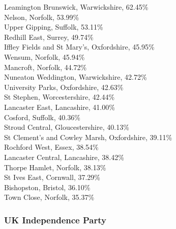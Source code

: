 \documentclass[a4paper,openany,10pt]{book}
\begin{document}
Leamington Brunswick, Warwickshire, 62.45\%\\
Nelson, Norfolk, 53.99\%\\
Upper Gipping, Suffolk, 53.11\%\\
Redhill East, Surrey, 49.74\%\\
Iffley Fields and St Mary's, Oxfordshire, 45.95\%\\
Wensum, Norfolk, 45.94\%\\
Mancroft, Norfolk, 44.72\%\\
Nuneaton Weddington, Warwickshire, 42.72\%\\
University Parks, Oxfordshire, 42.63\%\\
St Stephen, Worcestershire, 42.44\%\\
Lancaster East, Lancashire, 41.00\%\\
Cosford, Suffolk, 40.36\%\\
Stroud Central, Gloucestershire, 40.13\%\\
St Clement's and Cowley Marsh, Oxfordshire, 39.11\%\\
Rochford West, Essex, 38.54\%\\
Lancaster Central, Lancashire, 38.42\%\\
Thorpe Hamlet, Norfolk, 38.13\%\\
St Ives East, Cornwall, 37.29\%\\
Bishopston, Bristol, 36.10\%\\
Town Close, Norfolk, 35.37\%\\

\subsubsection*{UK Independence Party}
\end{document}
